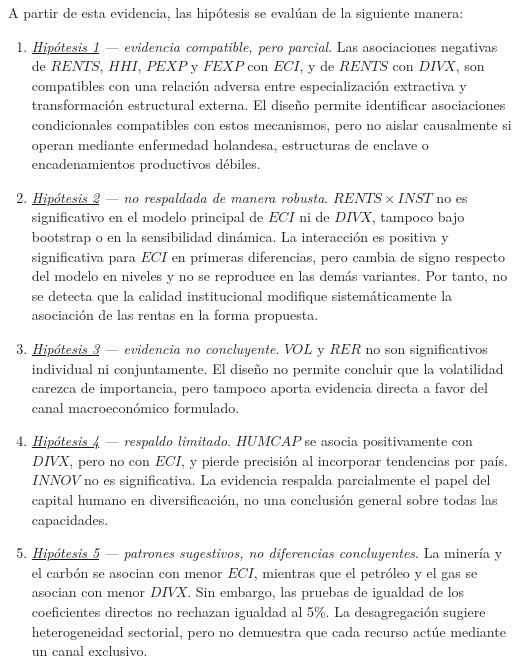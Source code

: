 \documentclass[../../TFM.tex]{subfiles}
\begin{document}
A partir de esta evidencia, las hipótesis se evalúan de la siguiente manera:

\begin{enumerate}
    \item \textit{\hyperref[hyp:h1]{Hipótesis 1} --- evidencia compatible, pero parcial}. Las asociaciones negativas de $RENTS$, $HHI$, $PEXP$ y $FEXP$ con $ECI$, y de $RENTS$ con $DIVX$, son compatibles con una relación adversa entre especialización extractiva y transformación estructural externa. El diseño permite identificar asociaciones condicionales compatibles con estos mecanismos, pero no aislar causalmente si operan mediante enfermedad holandesa, estructuras de enclave o encadenamientos productivos débiles.

    \item \textit{\hyperref[hyp:h2]{Hipótesis 2} --- no respaldada de manera robusta}. $RENTS\times INST$ no es significativo en el modelo principal de $ECI$ ni de $DIVX$, tampoco bajo bootstrap o en la sensibilidad dinámica. La interacción es positiva y significativa para $ECI$ en primeras diferencias, pero cambia de signo respecto del modelo en niveles y no se reproduce en las demás variantes. Por tanto, no se detecta que la calidad institucional modifique sistemáticamente la asociación de las rentas en la forma propuesta.

    \item \textit{\hyperref[hyp:h3]{Hipótesis 3} --- evidencia no concluyente}. $VOL$ y $RER$ no son significativos individual ni conjuntamente. El diseño no permite concluir que la volatilidad carezca de importancia, pero tampoco aporta evidencia directa a favor del canal macroeconómico formulado.

    \item \textit{\hyperref[hyp:h4]{Hipótesis 4} --- respaldo limitado}. $HUMCAP$ se asocia positivamente con $DIVX$, pero no con $ECI$, y pierde precisión al incorporar tendencias por país. $INNOV$ no es significativa. La evidencia respalda parcialmente el papel del capital humano en diversificación, no una conclusión general sobre todas las capacidades.

    \item \textit{\hyperref[hyp:h5]{Hipótesis 5} --- patrones sugestivos, no diferencias concluyentes}. La minería y el carbón se asocian con menor $ECI$, mientras que el petróleo y el gas se asocian con menor $DIVX$. Sin embargo, las pruebas de igualdad de los coeficientes directos no rechazan igualdad al 5\%. La desagregación sugiere heterogeneidad sectorial, pero no demuestra que cada recurso actúe mediante un canal exclusivo.
\end{enumerate}
\end{document}
